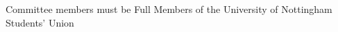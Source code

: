 \begin{clause}
  Committee members must be Full Members of the University of Nottingham Students' Union
\end{clause}